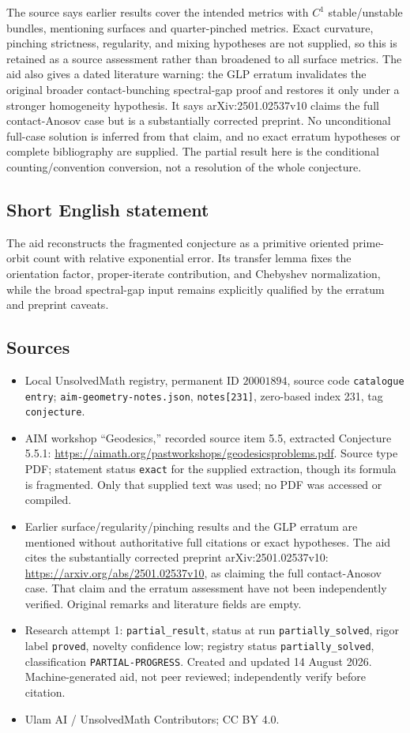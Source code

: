 \documentclass[11pt]{article}
\begin{document}
The source says earlier results cover the intended metrics with \(C^1\) stable/unstable bundles, mentioning surfaces and quarter-pinched metrics. Exact curvature, pinching strictness, regularity, and mixing hypotheses are not supplied, so this is retained as a source assessment rather than broadened to all surface metrics. The aid also gives a dated literature warning: the GLP erratum invalidates the original broader contact-bunching spectral-gap proof and restores it only under a stronger homogeneity hypothesis. It says arXiv:2501.02537v10 claims the full contact-Anosov case but is a substantially corrected preprint. No unconditional full-case solution is inferred from that claim, and no exact erratum hypotheses or complete bibliography are supplied. The partial result here is the conditional counting/convention conversion, not a resolution of the whole conjecture.
\subsection{Short English statement}
The aid reconstructs the fragmented conjecture as a primitive oriented prime-orbit count with relative exponential error. Its transfer lemma fixes the orientation factor, proper-iterate contribution, and Chebyshev normalization, while the broad spectral-gap input remains explicitly qualified by the erratum and preprint caveats.
\subsection{Sources}
\begin{itemize}
\item Local UnsolvedMath registry, permanent ID \(20001894\), source code \texttt{catalogue entry}; \texttt{aim-geometry-notes.json}, \texttt{notes[231]}, zero-based index 231, tag \texttt{conjecture}.
\item AIM workshop ``Geodesics,'' recorded source item 5.5, extracted Conjecture 5.5.1: \url{https://aimath.org/pastworkshops/geodesicsproblems.pdf}. Source type PDF; statement status \texttt{exact} for the supplied extraction, though its formula is fragmented. Only that supplied text was used; no PDF was accessed or compiled.
\item Earlier surface/regularity/pinching results and the GLP erratum are mentioned without authoritative full citations or exact hypotheses. The aid cites the substantially corrected preprint arXiv:2501.02537v10: \url{https://arxiv.org/abs/2501.02537v10}, as claiming the full contact-Anosov case. That claim and the erratum assessment have not been independently verified. Original remarks and literature fields are empty.
\item Research attempt 1: \texttt{partial\_result}, status at run \texttt{partially\_solved}, rigor label \texttt{proved}, novelty confidence low; registry status \texttt{partially\_solved}, classification \texttt{PARTIAL-PROGRESS}. Created and updated 14 August 2026. Machine-generated aid, not peer reviewed; independently verify before citation.
\item Ulam AI / UnsolvedMath Contributors; CC BY 4.0.
\end{itemize}
\end{document}
